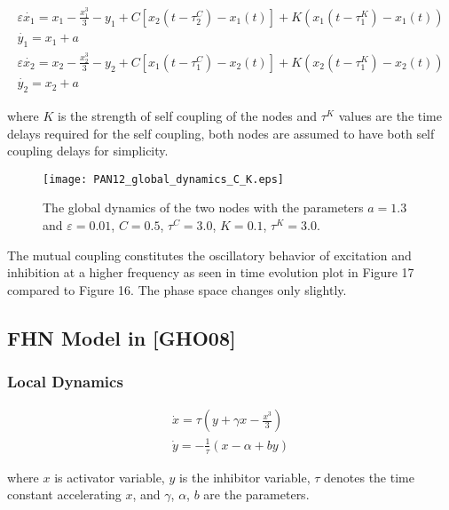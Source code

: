 \begin{subequations} \begin{align} \varepsilon  \dot{x_1} = x_1 - \frac{x_1^3}{3} -y_1  + C [x_2(t-\tau_2^C)-x_1(t)] + K(x_1(t-\tau_1^K) - x_1(t)) \label{eqn: frobenius 14}\\  \dot{y_1} = x_1+a \label{eqn: frobenius 15}  \\ \varepsilon  \dot{x_2} = x_2 - \frac{x_2^3}{3} -y_2  + C [x_1(t-\tau_1^C)-x_2(t)] + K(x_2(t-\tau_1^K) - x_2(t)) \label{eqn: frobenius 16}  \\  \dot{y_2} = x_2+a \label{eqn: frobenius 17} 
\end{align} 
\end{subequations}

where $K$ is the strength of self coupling of the nodes and $\tau^K$ values are the time delays required for the self coupling, both nodes are assumed to have both self coupling delays for simplicity.

\begin{figure}[h!]
	\centering
	\texttt{[image: PAN12\_global\_dynamics\_C\_K.eps]}
		\caption{The global dynamics of the two nodes with the parameters $a=1.3$ and $\varepsilon = 0.01$, $C=0.5$, $\tau^C= 3.0$, $K=0.1$, $\tau^K= 3.0$.}
\end{figure}

The mutual coupling constitutes the oscillatory behavior of excitation and inhibition at a higher frequency as seen in time evolution plot in Figure 17 compared to Figure 16. The phase space changes only slightly.

\subsection{FHN Model in [GHO08]}

\subsubsection{Local Dynamics}

\begin{subequations}
 \begin{align}\dot{x} = \tau (y + \gamma x - \frac{x^3}{3})  \label{eqn: frobenius 17}\\  \dot{y} = -\frac{1}{\tau} (x - \alpha + b y) \label{eqn: frobenius 18}   \end{align} 
\end{subequations}

where $x$ is activator variable, $y$ is the inhibitor variable, $\tau$ denotes the time constant accelerating $x$, and $\gamma$, $\alpha$, $b$ are the parameters. 

